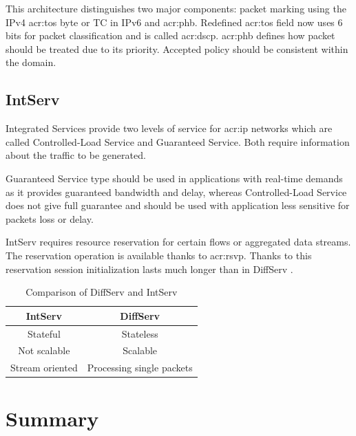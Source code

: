 \documentclass[11pt,openany]{book}
\begin{document}
        This architecture distinguishes two major components: packet marking using the IPv4 \gls{acr:tos} byte or TC in
        IPv6 and \gls{acr:phb}. Redefined \gls{acr:tos} field now uses 6 bits for packet classification and is called
        \gls{acr:dscp}.  \gls{acr:phb} defines how packet should be treated due to its priority. Accepted policy should
        be consistent within the domain.


      \subsection{IntServ}

        Integrated Services provide two levels of service for \gls{acr:ip} networks which are called Controlled-Load
        Service and Guaranteed Service. Both require information about the traffic to be generated. 

        Guaranteed Service type should be used in applications with real-time demands as it provides guaranteed
        bandwidth and delay, whereas Controlled-Load Service does not give full guarantee and should be used with
        application less sensitive for packets loss or delay.

        IntServ requires resource reservation for certain flows or aggregated data streams. The reservation operation is
        available thanks to \gls{acr:rsvp}. Thanks to this reservation session initialization lasts much longer than in
        DiffServ \cite{qos2}.

        \begin{table}[ht]
          \centering
          \begin{tabular}{|c|c|}
            \hline
            IntServ         & DiffServ                  \\
            \hline \hline
            Stateful        & Stateless                 \\
            \hline
            Not scalable    & Scalable                  \\
            \hline
            Stream oriented & Processing single packets \\
            \hline
          \end{tabular}

          \caption{Comparison of DiffServ and IntServ}
        \end{table}


    \section*{Summary}
\end{document}
